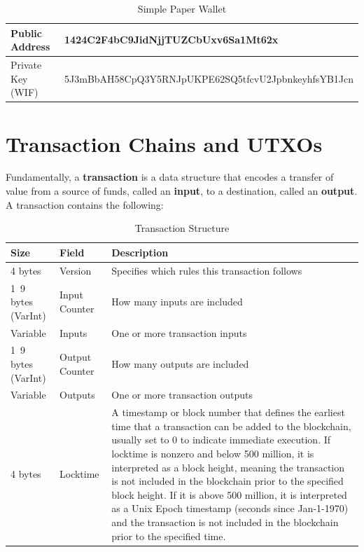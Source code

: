\documentclass{article}
\newcounter{code}[section]
\begin{document}
    \begin{table}[H]
    \centering
    \begin{tabular}{|l|l|}
    \hline
    Public Address & 1424C2F4bC9JidNjjTUZCbUxv6Sa1Mt62x \\
    \hline
    Private Key (WIF) & 5J3mBbAH58CpQ3Y5RNJpUKPE62SQ5tfcvU2JpbnkeyhfsYB1Jcn \\
    \hline
    \end{tabular}
    \caption{Simple Paper Wallet}
    \end{table}

\section{Transaction Chains and UTXOs}

    Fundamentally, a \textbf{transaction} is a data structure that encodes a transfer of value from a source of funds, called an \textbf{input}, to a destination, called an \textbf{output}. A transaction contains the following:

    \begin{table}[H]
    \centering
    \begin{tabular}{|l|l|l|}
    \hline
    Size & Field & Description \\
    \hline
    4 bytes & Version & Specifies which rules this transaction follows \\
    1~9 bytes (VarInt) & Input Counter & How many inputs are included \\
    Variable & Inputs & One or more transaction inputs \\
    1~9 bytes (VarInt) & Output Counter & How many outputs are included \\
    Variable & Outputs & One or more transaction outputs \\
    4 bytes & Locktime & A timestamp or block number that defines the earliest time that a transaction can be added to the blockchain, usually set to 0 to indicate immediate execution. If locktime is nonzero and below 500 million, it is interpreted as a block height, meaning the transaction is not included in the blockchain prior to the specified block height. If it is above 500 million, it is interpreted as a Unix Epoch timestamp (seconds since Jan-1-1970) and the transaction is not included in the blockchain prior to the specified time. \\
    \hline
    \end{tabular}
    \caption{Transaction Structure}
    \end{table}
\end{document}
